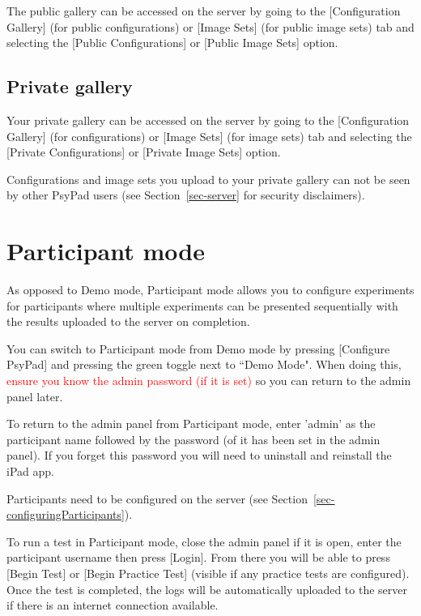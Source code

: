 \documentclass{article}
\begin{document}
The public gallery can be accessed on the server by going to the [Configuration Gallery] (for public configurations) or [Image Sets] (for public image sets) tab and selecting the [Public Configurations] or [Public Image Sets] option.

\subsection{Private gallery}
\label{sec-privateGallery}

Your private gallery can be accessed on the server by going to the [Configuration Gallery] (for configurations) or [Image Sets] (for image sets) tab and selecting the [Private Configurations] or [Private Image Sets] option.

Configurations and image sets you upload to your private gallery can not be seen by other PsyPad users (see Section~\ref{sec-server} for security disclaimers).


\section{Participant mode}
\label{sec-participantMode}

As opposed to Demo mode, Participant mode allows you to configure experiments for participants
where multiple experiments can be presented sequentially with the
results uploaded to the server on completion.

You can switch to Participant mode from Demo mode by pressing
[Configure PsyPad] and pressing the green toggle next to ``Demo Mode".
When doing this, \textcolor{red}{ensure you know the admin password (if it is set)} so you can return to
the admin panel later.

To return to the admin panel from Participant mode,
enter 'admin' as the participant name followed by the password (of it has been 
set in the admin panel).
If you forget this password you will need to uninstall and reinstall
the iPad app.

Participants need to be configured on the server (see Section~\ref{sec-configuringParticipants}).

To run a test in Participant mode, close the admin panel if it is open,
enter the participant username then press [Login].
From there you will be able to press [Begin Test] or [Begin Practice
Test] (visible if any practice tests are configured).
Once the test is completed, the logs will be automatically uploaded to
the server if there is an internet connection available.
\end{document}
